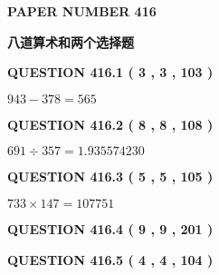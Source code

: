 \documentclass{ctexart}
\begin{document}
 
 
 
 
   
   
\newpage 
\setcounter{page}{ 
   416001 } 
   
   
   
   
 {\textbf{ \Large{ PAPER NUMBER  416  }}}
   
   
\vspace{0.2in}
   
   
   
   
   
   
 \vspace{0.2in}
{\LARGE {\textbf{ 八道算术和两个选择题}}}
   
   
  
\vspace{0.2in}
  
{\textbf{\Large{QUESTION
416.1 
 ( 3 , 3 , 103 )
}}}
  
  
 
 

$ %
943 -  %
378=   %
565$
 
 
  
\vspace{0.2in}
  
{\textbf{\Large{QUESTION
416.2 
 ( 8 , 8 , 108 )
}}}
  
  
 
 

$ %
691 \div  %
357=   %
1.935574230$
 
 
  
\vspace{0.2in}
  
{\textbf{\Large{QUESTION
416.3 
 ( 5 , 5 , 105 )
}}}
  
  
 
 

$ %
733 \times  %
147=   %
107751$
 
 
  
\vspace{0.2in}
  
{\textbf{\Large{QUESTION
416.4 
 ( 9 , 9 , 201 )
}}}
  
  
  
\vspace{0.2in}
  
{\textbf{\Large{QUESTION
416.5 
 ( 4 , 4 , 104 )
}}}
  
  
 
 
\end{document}
